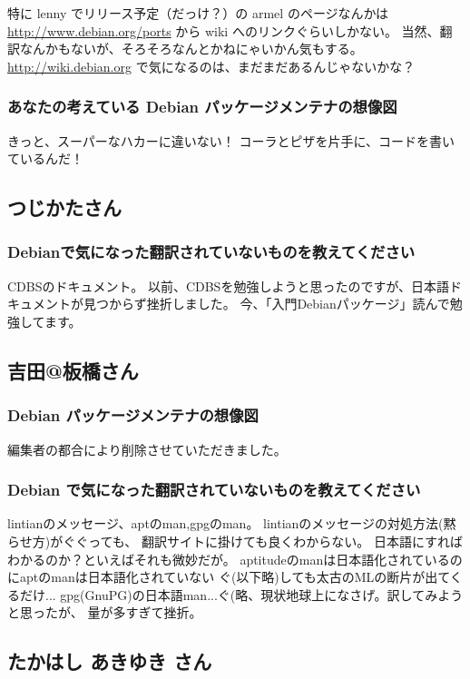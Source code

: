 \documentclass[mingoth,a4paper]{jsarticle}
\begin{document}
特に lenny でリリース予定（だっけ？）の armel のページなんかは
\url{http://www.debian.org/ports} から wiki へのリンクぐらいしかない。
当然、翻訳なんかもないが、そろそろなんとかねにゃいかん気もする。
\url{http://wiki.debian.org} で気になるのは、まだまだあるんじゃないかな？


\subsubsection{あなたの考えている Debian パッケージメンテナの想像図}
きっと、スーパーなハカーに違いない！
コーラとピザを片手に、コードを書いているんだ！

\subsection{つじかたさん}
\subsubsection{Debianで気になった翻訳されていないものを教えてください}
CDBSのドキュメント。
以前、CDBSを勉強しようと思ったのですが、日本語ドキュメントが見つからず挫折しました。
今、「入門Debianパッケージ」読んで勉強してます。


\subsection{吉田@板橋さん}

\subsubsection{Debian パッケージメンテナの想像図}
編集者の都合により削除させていただきました。

\subsubsection{Debian で気になった翻訳されていないものを教えてください}
lintianのメッセージ、aptのman,gpgのman。
lintianのメッセージの対処方法(黙らせ方)がぐぐっても、
翻訳サイトに掛けても良くわからない。
日本語にすればわかるのか？といえばそれも微妙だが。
aptitudeのmanは日本語化されているのにaptのmanは日本語化されていない
ぐ(以下略)しても太古のMLの断片が出てくるだけ...
gpg(GnuPG)の日本語man...ぐ(略、現状地球上になさげ。訳してみようと思ったが、
量が多すぎて挫折。

\subsection{たかはし あきゆき さん}
\end{document}

